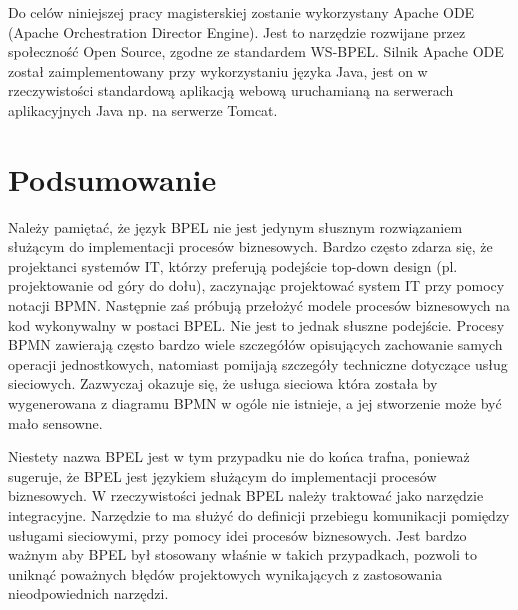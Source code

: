 Do celów niniejszej pracy magisterskiej zostanie wykorzystany Apache ODE (Apache Orchestration Director Engine). Jest to narzędzie rozwijane przez społeczność Open Source, zgodne ze standardem WS-BPEL. Silnik Apache ODE został zaimplementowany przy wykorzystaniu języka Java, jest on w rzeczywistości standardową aplikacją webową uruchamianą na serwerach aplikacyjnych Java np. na serwerze Tomcat. 


\section{Podsumowanie}
\label{sec:bpelSummary}
Należy pamiętać, że język BPEL nie jest jedynym słusznym rozwiązaniem służącym do implementacji procesów biznesowych. Bardzo często  zdarza się, że projektanci systemów IT, którzy preferują podejście top-down design (pl. projektowanie od góry do dołu), zaczynając projektować system IT przy pomocy notacji BPMN. Następnie zaś próbują przełożyć modele procesów biznesowych na kod wykonywalny w postaci BPEL. Nie jest to jednak słuszne podejście. Procesy BPMN zawierają często bardzo wiele szczegółów opisujących zachowanie samych operacji jednostkowych, natomiast pomijają szczegóły techniczne dotyczące usług sieciowych.  Zazwyczaj okazuje się, że usługa sieciowa która została by wygenerowana z diagramu BPMN w ogóle nie istnieje, a jej stworzenie może być mało sensowne.

Niestety nazwa BPEL jest w tym przypadku nie do końca trafna, ponieważ sugeruje, że BPEL jest językiem służącym do implementacji procesów biznesowych. W rzeczywistości jednak BPEL należy traktować jako narzędzie integracyjne. Narzędzie to ma służyć do definicji przebiegu komunikacji pomiędzy usługami sieciowymi, przy pomocy idei procesów biznesowych. Jest bardzo ważnym aby BPEL był stosowany właśnie w takich przypadkach, pozwoli to uniknąć poważnych błędów projektowych wynikających z zastosowania nieodpowiednich narzędzi.  